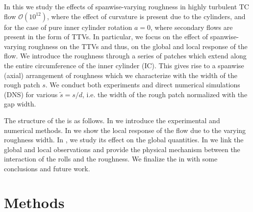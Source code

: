 In this \docname we study the effects of spanwise-varying roughness in highly turbulent TC flow $\mathcal{O}(10^{12})$, where the effect of curvature is present due to the cylinders, and for the case of pure inner cylinder rotation $a=0$, where secondary flows are present in the form of TTVs. In particular, we focus on the effect of spanwise-varying roughness on the TTVs and thus, on the global and local response of the flow. We introduce the roughness through a series of patches which extend along the entire circumference of the inner cylinder (IC). This gives rise to a spanwise (axial) arrangement of roughness which we characterize with the width of the rough patch $s$. We conduct both experiments and direct numerical simulations (DNS) for various $\tilde{s}=s/d$, i.e. the width of the rough patch normalized with the gap width.

The structure of the \docname is as follows. In  we introduce the experimental and numerical methods. In  we show the local response of the flow due to the varying roughness width.  In , we study its effect on the global quantities. In  we link the global and local observations and provide the physical mechanism between the interaction of the rolls and the roughness. We finalize the \docname in  with some conclusions and future work.

\section{Methods}
\label{sec:methods}
